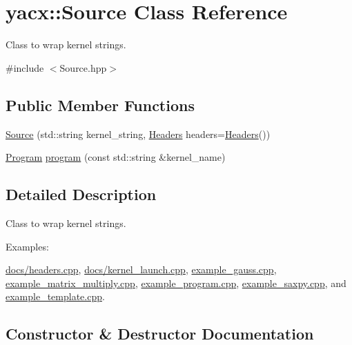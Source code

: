 \hypertarget{classyacx_1_1_source}{}\section{yacx\+:\+:Source Class Reference}
\label{classyacx_1_1_source}


Class to wrap kernel strings.  




{\ttfamily \#include $<$Source.\+hpp$>$}

\subsection*{Public Member Functions}
\begin{DoxyCompactItemize}
\item 
\hyperlink{classyacx_1_1_source_ab38b16f1049de5ba1c5c1ccf1a890ece}{Source} (std\+::string kernel\+\_\+string, \hyperlink{classyacx_1_1_headers}{Headers} headers=\hyperlink{classyacx_1_1_headers}{Headers}())
\item 
\hyperlink{classyacx_1_1_program}{Program} \hyperlink{classyacx_1_1_source_a2d95fc130b3c3d6a2a1f20097d5a278f}{program} (const std\+::string \&kernel\+\_\+name)
\end{DoxyCompactItemize}


\subsection{Detailed Description}
Class to wrap kernel strings. \begin{Desc}
\item[Examples\+: ]\par
\hyperlink{docs_2headers_8cpp-example}{docs/headers.\+cpp}, \hyperlink{docs_2kernel_launch_8cpp-example}{docs/kernel\+\_\+launch.\+cpp}, \hyperlink{example_gauss_8cpp-example}{example\+\_\+gauss.\+cpp}, \hyperlink{example_matrix_multiply_8cpp-example}{example\+\_\+matrix\+\_\+multiply.\+cpp}, \hyperlink{example_program_8cpp-example}{example\+\_\+program.\+cpp}, \hyperlink{example_saxpy_8cpp-example}{example\+\_\+saxpy.\+cpp}, and \hyperlink{example_template_8cpp-example}{example\+\_\+template.\+cpp}.\end{Desc}


\subsection{Constructor \& Destructor Documentation}
\mbox{\label{classyacx_1_1_source_ab38b16f1049de5ba1c5c1ccf1a890ece}} 
